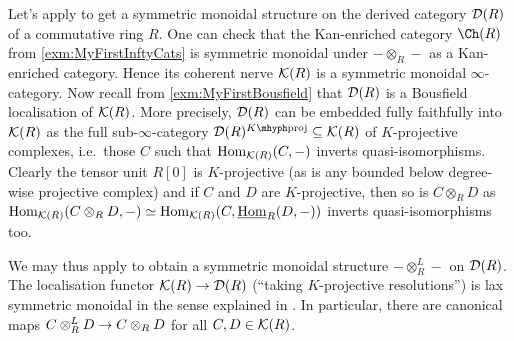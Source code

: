 Let's apply  to get a symmetric monoidal structure on the derived category $\mathcal{D}(R)$ of a commutative ring $R$. One can check that the Kan-enriched category $\Ch(R)$ from \cref{exm:MyFirstInftyCats} is symmetric monoidal under $-\otimes_R-$ as a Kan-enriched category. Hence its coherent nerve $\mathcal{K}(R)$ is a symmetric monoidal $\infty$-category. Now recall from \cref{exm:MyFirstBousfield} that $\mathcal{D}(R)$ is a Bousfield localisation of $\mathcal{K}(R)$. More precisely, $\mathcal{D}(R)$ can be embedded fully faithfully into $\mathcal{K}(R)$ as the full sub-$\infty$-category $\Dd(R) ^{K\mhyph\mathrm{proj}}\subseteq \Kk(R)$ of $K$-projective complexes, i.e.\ those $C$ such that $\operatorname{Hom}_{\mathcal{K}(R)}(C,-)$ inverts quasi-isomorphisms. Clearly the tensor unit $R[0]$ is $K$-projective (as is any bounded below degree-wise projective complex) and if $C$ and $D$ are $K$-projective, then so is $C\otimes_RD$ as $\operatorname{Hom}_{\mathcal{K}(R)}(C\otimes_RD,-)\simeq \operatorname{Hom}_{\mathcal{K}(R)}(C,\operatorname{\underline{Hom}}_R(D,-))$ inverts quasi-isomorphisms too.

We may thus apply  to obtain a symmetric monoidal structure $-\otimes_R^L-$ on $\mathcal{D}(R)$. The localisation functor $\Kk(R)\morphism\Dd(R)$ (\enquote{taking $K$-projective resolutions}) is lax symmetric monoidal in the sense explained in . In particular, there are canonical maps $C\otimes_R^LD\morphism C\otimes_RD$ for all $C,D\in \mathcal{K}(R)$.

		
		
